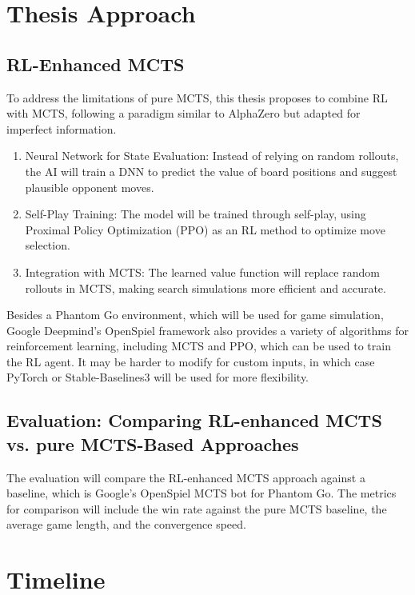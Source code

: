 \documentclass[12pt,oneside,openright]{article}
\begin{document}
\section{Thesis Approach}


\subsection{RL-Enhanced MCTS}

To address the limitations of pure MCTS, this thesis proposes to combine RL with MCTS, following a paradigm similar to AlphaZero but adapted for imperfect information.

\begin{enumerate}
    \item Neural Network for State Evaluation: Instead of relying on random rollouts, the AI will train a DNN to predict the value of board positions and suggest plausible opponent moves.
    \item Self-Play Training: The model will be trained through self-play, using Proximal Policy Optimization (PPO) as an RL method to optimize move selection.
    \item Integration with MCTS: The learned value function will replace random rollouts in MCTS, making search simulations more efficient and accurate.
\end{enumerate}

Besides a Phantom Go environment, which will be used for game simulation, Google Deepmind's OpenSpiel framework also provides a variety of algorithms for reinforcement learning, including MCTS and PPO, which can be used to train the RL agent. It may be harder to modify for custom inputs, in which case PyTorch or Stable-Baselines3 will be used for more flexibility.

\subsection{Evaluation: Comparing RL-enhanced MCTS vs. pure MCTS-Based Approaches}

The evaluation will compare the RL-enhanced MCTS approach against a baseline, which is Google's OpenSpiel MCTS bot for Phantom Go. The metrics for comparison will include the win rate against the pure MCTS baseline, the average game length, and the convergence speed.


\section{Timeline}
\end{document}
